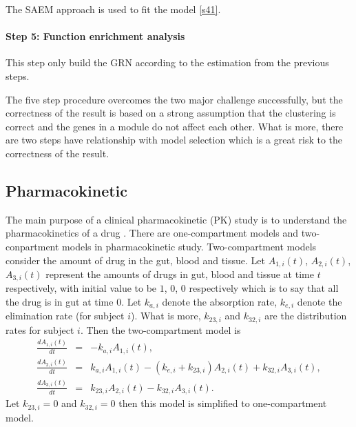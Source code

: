 \documentclass[12pt]{extarticle}
\begin{document}
The SAEM approach \cite{Delyon99} is used to fit the model \eqref{s41}.
\paragraph{Step 5: Function enrichment analysis}
This step only build the GRN according to the estimation from the previous steps.

The five step procedure overcomes the two major challenge successfully, but the correctness of the result is based on a strong assumption that the clustering is correct and the genes in a module do not affect each other. What is more, there are two steps have relationship with model selection which is a great risk to the correctness of the result.

\subsection{Pharmacokinetic}
\label{sect:pharmacokinetic}
The main purpose of a clinical pharmacokinetic (PK) study is to understand the pharmacokinetics of a drug \cite{Li02}. There are one-compartment models and two-conpartment models in pharmacokinetic study. Two-compartment models consider the amount of drug in the gut, blood and tissue. Let $A_{1,i}(t)$, $A_{2,i}(t)$, $A_{3,i}(t)$ represent the amounts of drugs in gut, blood and tissue at time $t$ respectively, with initial value to be $1$, $0$, $0$ respectively which is to say that all the drug is in gut at time $0$. Let $k_{a,i}$ denote the absorption rate, $k_{e,i}$ denote the elimination rate (for subject $i$). What is more, $k_{23,i}$ and $k_{32,i}$ are the distribution rates for subject $i$. Then the two-compartment model is
\begin{equation}
\begin{array}{rcl}
\frac{dA_{1,i}(t)}{dt} & = & -k_{a,i}A_{1,i}(t), \\
\frac{dA_{2,i}(t)}{dt} & = & k_{a,i}A_{1,i}(t) - (k_{e,i}+k_{23,i})A_{2,i}(t)+k_{32,i}A_{3,i}(t), \\
\frac{dA_{3,i}(t)}{dt} & = & k_{23,i}A_{2,i}(t)-k_{32,i}A_{3,i}(t).
\end{array}
\end{equation}
Let $k_{23,i}=0$ and $k_{32,i}=0$ then this model is simplified to one-compartment model. 
\end{document}
